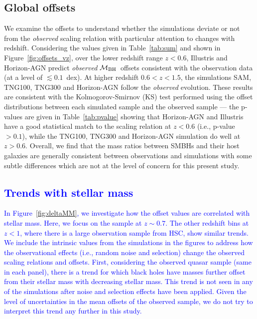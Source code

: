\documentclass[twocolumn]{aastex631}
\newcommand{\blue}[1]{\textcolor{blue}{#1}}
\def\mbh{$\mathcal M_{\rm BH}$}
\begin{document}
\subsection{Global offsets}

We examine the offsets to understand whether the simulations deviate or not from the {\it observed} scaling relation with particular attention to changes with redshift. Considering the values given in Table~\ref{tab:sum} and shown in Figure~\ref{fig:offsets_vz}, over the lower redshift range $z<0.6$, Illustris and Horizon-AGN predict {\it observed} \mbh\ offsets consistent with the observation data (at a level of $\lesssim0.1$~dex). At higher redshift $0.6<z<1.5$, the simulations SAM, TNG100, TNG300 and Horizon-AGN follow the {\it observed} evolution. These results are consistent with the Kolmogorov-Smirnov (KS) test performed using the offset distributions between each simulated sample and the observed sample --- the p-values are given in Table~\ref{tab:pvalue} showing that Horizon-AGN and Illustris have a good statistical match to the scaling relation at $z<0.6$ (i.e., p-value $> 0.1$), while the TNG100, TNG300 and Horizon-AGN simulation do well at $z>0.6$. Overall, we find that the mass ratios between SMBHs and their host galaxies are generally consistent between observations and simulations with some subtle differences which are not at the level of concern for this present study.

\blue{
\subsection{Trends with stellar mass}
In Figure~\ref{fig:deltaMM}, we investigate how the offset values are correlated with stellar mass. Here, we focus on the sample at $z\sim0.7$. The other redshift bins at $z<1$, where there is a large observation sample from HSC, show similar trends. We include the intrinsic values from the simulations in the figures to address how the observational effects (i.e., random noise and selection) change the observed scaling relations and offsets. First, considering the observed quasar sample (same in each panel), there is a trend for which black holes have masses further offset from their stellar mass with decreasing stellar mass. This trend is not seen in any of the simulations after noise and selection effects have been applied. Given the level of uncertainties in the mean offsets of the observed sample, we do not try to interpret this trend any further in this study.}   
\end{document}
